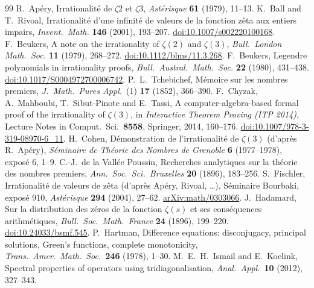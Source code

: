 \documentclass[11pt]{article}
\theoremstyle{plain}
\theoremstyle{definition}
\theoremstyle{remark}
\begin{document}
\begin{thebibliography}{99}
 R.~Ap\'ery, Irrationalit\'e de $\zeta2$ et $\zeta3$, \emph{Ast\'erisque} \textbf{61}
  (1979), 11--13.
 K.~Ball and T.~Rivoal, Irrationalit\'e d'une infinit\'e de valeurs de la
  fonction z\^eta aux entiers impairs, \emph{Invent.\ Math.} \textbf{146} (2001), 193--207.
  \href{https://doi.org/10.1007/s002220100168}{doi:10.1007/s002220100168}.
 F.~Beukers, A note on the irrationality of $\zeta(2)$ and $\zeta(3)$,
  \emph{Bull.\ London Math.\ Soc.} \textbf{11} (1979), 268--272.
  \href{https://doi.org/10.1112/blms/11.3.268}{doi:10.1112/blms/11.3.268}.
 F.~Beukers, Legendre polynomials in irrationality proofs,
  \emph{Bull.\ Austral.\ Math.\ Soc.} \textbf{22} (1980), 431--438.
  \href{https://doi.org/10.1017/S0004972700006742}{doi:10.1017/S0004972700006742}.
 P.~L.~Tchebichef, M\'emoire sur les nombres premiers, \emph{J.\ Math.\ Pures
  Appl.}\ (1) \textbf{17} (1852), 366--390.
 F.~Chyzak, A.~Mahboubi, T.~Sibut-Pinote and E.~Tassi, A computer-algebra-based formal
  proof of the irrationality of $\zeta(3)$, in \emph{Interactive Theorem Proving (ITP 2014)},
  Lecture Notes in Comput.\ Sci.\ \textbf{8558}, Springer, 2014, 160--176.
  \href{https://doi.org/10.1007/978-3-319-08970-6_11}{doi:10.1007/978-3-319-08970-6\_11}.
 H.~Cohen, D\'emonstration de l'irrationalit\'e de $\zeta(3)$ (d'apr\`es R.~Ap\'ery),
  \emph{S\'eminaire de Th\'eorie des Nombres de Grenoble} \textbf{6} (1977--1978), expos\'e 6, 1--9.
 C.-J.~de la Vall\'ee Poussin, Recherches analytiques sur la th\'eorie des nombres
  premiers, \emph{Ann.\ Soc.\ Sci.\ Bruxelles} \textbf{20} (1896), 183--256.
 S.~Fischler, Irrationalit\'e de valeurs de z\^eta (d'apr\`es Ap\'ery, Rivoal,
  \dots), S\'eminaire Bourbaki, expos\'e 910, \emph{Ast\'erisque} \textbf{294} (2004), 27--62.
  \href{https://arxiv.org/abs/math/0303066}{arXiv:math/0303066}.
 J.~Hadamard, Sur la distribution des z\'eros de la fonction $\zeta(s)$ et ses
  cons\'equences arithm\'etiques, \emph{Bull.\ Soc.\ Math.\ France} \textbf{24} (1896), 199--220.
  \href{https://doi.org/10.24033/bsmf.545}{doi:10.24033/bsmf.545}.
 P.~Hartman, Difference equations: disconjugacy, principal solutions, Green's
  functions, complete monotonicity, \emph{Trans.\ Amer.\ Math.\ Soc.}\ \textbf{246} (1978), 1--30.
 M.~E.~H.~Ismail and E.~Koelink, Spectral properties of operators using
  tridiagonalisation, \emph{Anal.\ Appl.}\ \textbf{10} (2012), 327--343.

\end{thebibliography}
\end{document}
